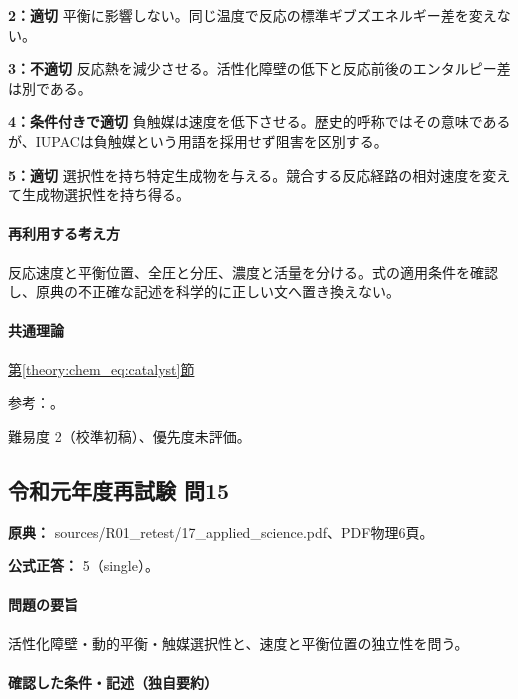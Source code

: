 \noindent\textbf{2：適切} 平衡に影響しない。同じ温度で反応の標準ギブズエネルギー差を変えない。\par

\noindent\textbf{3：不適切} 反応熱を減少させる。活性化障壁の低下と反応前後のエンタルピー差は別である。\par

\noindent\textbf{4：条件付きで適切} 負触媒は速度を低下させる。歴史的呼称ではその意味であるが、IUPACは負触媒という用語を採用せず阻害を区別する。\par

\noindent\textbf{5：適切} 選択性を持ち特定生成物を与える。競合する反応経路の相対速度を変えて生成物選択性を持ち得る。\par

\paragraph{再利用する考え方} 反応速度と平衡位置、全圧と分圧、濃度と活量を分ける。式の適用条件を確認し、原典の不正確な記述を科学的に正しい文へ置き換えない。

\paragraph{共通理論} \hyperref[theory:chem_eq:catalyst]{第\ref*{theory:chem_eq:catalyst}節}

\par 参考：\cite{iupac_greenbook2012,iupac_catalyst}。

\par 難易度 2（校準初稿）、優先度未評価。

\subsection{令和元年度再試験 問15}
\label{q:r01-ret-applied-15}

\noindent\textbf{原典：} sources/R01\_retest/17\_applied\_science.pdf、PDF物理6頁。

\textbf{公式正答：} 5（single）。

\paragraph{問題の要旨} 活性化障壁・動的平衡・触媒選択性と、速度と平衡位置の独立性を問う。

\paragraph{確認した条件・記述（独自要約）}\mbox{}\par

